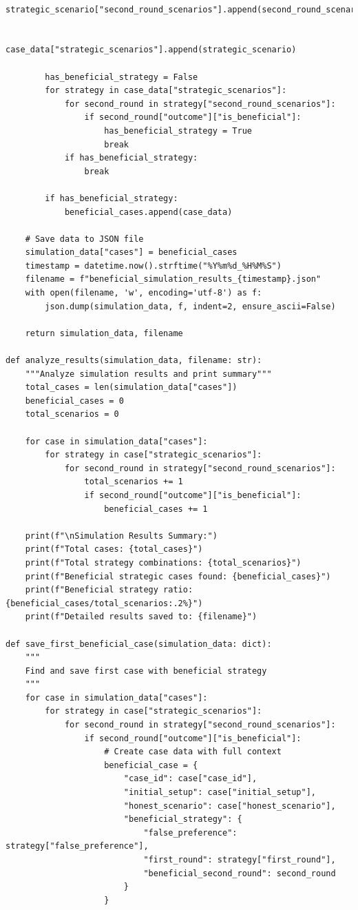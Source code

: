\documentclass{article}
\begin{document}
\begin{verbatim}
                        strategic_scenario["second_round_scenarios"].append(second_round_scenario)
            
            case_data["strategic_scenarios"].append(strategic_scenario)
        
        has_beneficial_strategy = False
        for strategy in case_data["strategic_scenarios"]:
            for second_round in strategy["second_round_scenarios"]:
                if second_round["outcome"]["is_beneficial"]:
                    has_beneficial_strategy = True
                    break
            if has_beneficial_strategy:
                break
        
        if has_beneficial_strategy:
            beneficial_cases.append(case_data)
    
    # Save data to JSON file
    simulation_data["cases"] = beneficial_cases
    timestamp = datetime.now().strftime("%Y%m%d_%H%M%S")
    filename = f"beneficial_simulation_results_{timestamp}.json"
    with open(filename, 'w', encoding='utf-8') as f:
        json.dump(simulation_data, f, indent=2, ensure_ascii=False)
    
    return simulation_data, filename

def analyze_results(simulation_data, filename: str):
    """Analyze simulation results and print summary"""
    total_cases = len(simulation_data["cases"])
    beneficial_cases = 0
    total_scenarios = 0
    
    for case in simulation_data["cases"]:
        for strategy in case["strategic_scenarios"]:
            for second_round in strategy["second_round_scenarios"]:
                total_scenarios += 1
                if second_round["outcome"]["is_beneficial"]:
                    beneficial_cases += 1
                
    print(f"\nSimulation Results Summary:")
    print(f"Total cases: {total_cases}")
    print(f"Total strategy combinations: {total_scenarios}")
    print(f"Beneficial strategic cases found: {beneficial_cases}")
    print(f"Beneficial strategy ratio: {beneficial_cases/total_scenarios:.2%}")
    print(f"Detailed results saved to: {filename}")

def save_first_beneficial_case(simulation_data: dict):
    """
    Find and save first case with beneficial strategy
    """
    for case in simulation_data["cases"]:
        for strategy in case["strategic_scenarios"]:
            for second_round in strategy["second_round_scenarios"]:
                if second_round["outcome"]["is_beneficial"]:
                    # Create case data with full context
                    beneficial_case = {
                        "case_id": case["case_id"],
                        "initial_setup": case["initial_setup"],
                        "honest_scenario": case["honest_scenario"],
                        "beneficial_strategy": {
                            "false_preference": strategy["false_preference"],
                            "first_round": strategy["first_round"],
                            "beneficial_second_round": second_round
                        }
                    }
                    

\end{verbatim}
\end{document}
